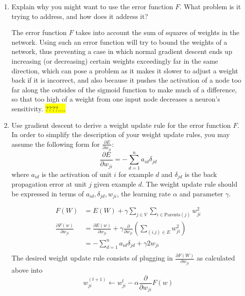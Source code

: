\documentclass{article}
\newcommand{\edit}[1]{\colorbox{Yellow}{#1}}
\newcommand{\dee}[2]{\frac{\partial{#1}}{\partial{#2}}}
\begin{document}
\begin{enumerate}
\item Explain why you might want to use the error function $F$. What
problem is it trying to address, and how does it address it?

The error function $F$ takes into account the sum of squares of weights
in the network. Using such an error function will try to bound the
weights of a network, thus preventing a case in which normal gradient
descent ends up increasing (or decreasing) certain weights exceedingly far
in the same direction, which can pose a problem as it makes it 
slower to adjust a weight back if it is incorrect, and also because it pushes
the activation of a node too far along the outsides of the sigmoid
function to make much of a difference, so that too high of a weight
from one input node decreases a neuron's sensitivity. 
\edit{????....}

\item Use gradient descent to derive a weight update rule for the
error function $F$. In order to simplify the description of your
weight update rules, you may assume the following form for $\frac{\partial E}{\partial w_{ji}}$:
$$\frac{\partial E}{\partial w_{ji}} = -\sum_{d=1}^n a_{id} \delta_{jd}$$
where $a_{id}$ is the activation of unit $i$ for example $d$ and 
$\delta_{jd}$ is the back propagation error at unit $j$ given example
$d$. The weight update rule should be expressed in terms of $a_{id},\delta_{jd},w_{ji}$,
the learning rate $\alpha$ and parameter $\gamma$. 

\begin{align*}
F(W) & = E(W)+\gamma\sum_{j\in V}\sum_{i\in \text{Parents}(j)} w_{ji}^2 \\
\dee{F(w)}{w_{ji}} & = \dee{E(w)}{w_{ji}} + \gamma \dee{}{w_{ji}} \left( \sum_{(i.j)\in E} w_{ji}^2\right) \\
 & = -\sum_{d=1}^n a_{id} \delta_{jd}+ \gamma 2w_{ji}\\
\end{align*}
The desired weight update rule consists of plugging in $\dee{F(W)}{w_{ji}}$ as calculated
above into 
$$w_{ji}^{(t+1)}\leftarrow w_{ji}^t-\alpha \dee{}{w_{ji}} F(w)$$
\end{enumerate}
\end{document}
